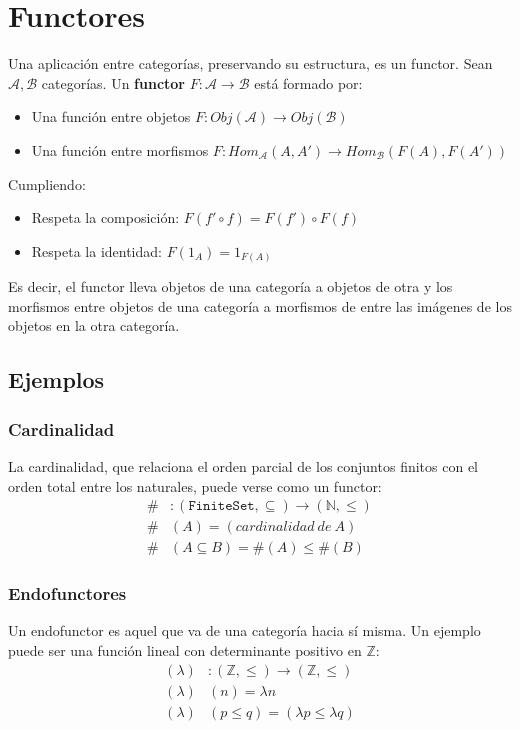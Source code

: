 \documentclass[a4paper, 11pt]{amsart}
\theoremstyle{definition}
\theoremstyle{remark}
\numberwithin{equation}{section}
\begin{document}
\section {Functores}
  Una aplicación entre categorías, preservando su estructura, es un functor.
   Sean $\mathcal{A}, \mathcal{B}$ categorías. Un \textbf{functor} 
  $F: \mathcal{A} \rightarrow \mathcal{B}$ está formado por:
  \begin{itemize}
   \item Una función entre objetos $F: Obj(\mathcal{A}) \rightarrow Obj(\mathcal{B})$
   \item Una función entre morfismos $F: Hom_\mathcal{A}(A,A') \rightarrow Hom_\mathcal{B}(F(A),F(A'))$
  \end{itemize}
  Cumpliendo:
  \begin{itemize}
   \item Respeta la composición: $F(f' \circ f) = F(f') \circ F(f)$
   \item Respeta la identidad: $F(1_A) = 1_{F(A)}$
  \end{itemize}

  
  Es decir, el functor lleva objetos de una categoría a objetos de otra y los morfismos
  entre objetos de una categoría a morfismos de entre las imágenes de los objetos en la
  otra categoría.

  \subsection {Ejemplos}
    \subsubsection{Cardinalidad}
      La cardinalidad, que relaciona el orden parcial de los conjuntos finitos con el
      orden total entre los naturales, puede verse como un functor:
      \begin{align*}
	\#&: \mathtt{(FiniteSet,\subseteq)} \rightarrow \mathtt{(\mathbb{N},\leq)} \\
	\#&(A) = (cardinalidad\ de\ A) \\
	\#&(A \subseteq B) = \#(A) \leq \#(B) 
      \end{align*}
    
    \subsubsection{Endofunctores}
      Un endofunctor es aquel que va de una categoría hacia sí misma. Un ejemplo
      puede ser una función lineal con determinante positivo en $\mathbb{Z}$:
      \begin{align*}
       (\lambda)&: \mathtt{(\mathbb{Z},\leq)} \rightarrow \mathtt{(\mathbb{Z},\leq)} \\
       (\lambda)&(n) = \lambda n \\
       (\lambda)&(p \leq q) = (\lambda p \leq \lambda q)
      \end{align*}
\end{document}
